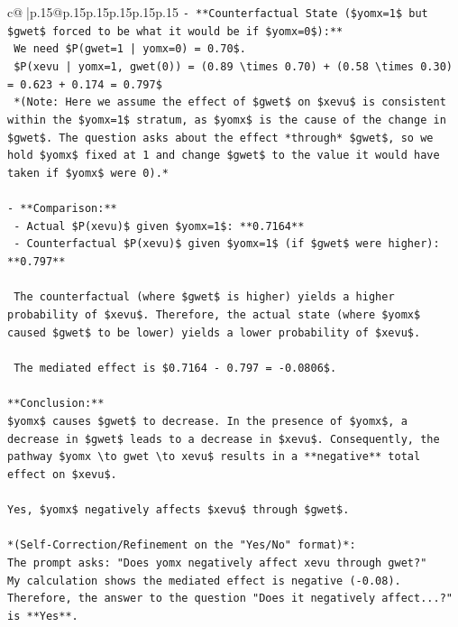 \documentclass{article}
\begin{document}
{\begin{supertabular}{c@{$\;$}|p{.15\linewidth}@{}p{.15\linewidth}p{.15\linewidth}p{.15\linewidth}p{.15\linewidth}p{.15\linewidth}}
{{{\texttt{{-} **Counterfactual State (\$yomx=1\$ but \$gwet\$ forced to be what it would be if \$yomx=0\$):**} \\
\texttt{  We need \$P(gwet=1 | yomx=0) = 0.70\$.} \\
\texttt{  \$P(xevu | yomx=1, gwet(0)) = (0.89 \textbackslash{}times 0.70) + (0.58 \textbackslash{}times 0.30) = 0.623 + 0.174 = 0.797\$} \\
\texttt{  *(Note: Here we assume the effect of \$gwet\$ on \$xevu\$ is consistent within the \$yomx=1\$ stratum, as \$yomx\$ is the cause of the change in \$gwet\$. The question asks about the effect *through* \$gwet\$, so we hold \$yomx\$ fixed at 1 and change \$gwet\$ to the value it would have taken if \$yomx\$ were 0).*} \\
\\ 
\texttt{{-} **Comparison:**} \\
\texttt{  {-} Actual \$P(xevu)\$ given \$yomx=1\$: **0.7164**} \\
\texttt{  {-} Counterfactual \$P(xevu)\$ given \$yomx=1\$ (if \$gwet\$ were higher): **0.797**} \\
\\ 
\texttt{  The counterfactual (where \$gwet\$ is higher) yields a higher probability of \$xevu\$. Therefore, the actual state (where \$yomx\$ caused \$gwet\$ to be lower) yields a lower probability of \$xevu\$.} \\
\\ 
\texttt{  The mediated effect is \$0.7164 {-} 0.797 = {-}0.0806\$.} \\
\\ 
\texttt{**Conclusion:**} \\
\texttt{\$yomx\$ causes \$gwet\$ to decrease. In the presence of \$yomx\$, a decrease in \$gwet\$ leads to a decrease in \$xevu\$. Consequently, the pathway \$yomx \textbackslash{}to gwet \textbackslash{}to xevu\$ results in a **negative** total effect on \$xevu\$.} \\
\\ 
\texttt{Yes, \$yomx\$ negatively affects \$xevu\$ through \$gwet\$.} \\
\\ 
\texttt{*(Self{-}Correction/Refinement on the "Yes/No" format)*:} \\
\texttt{The prompt asks: "Does yomx negatively affect xevu through gwet?"} \\
\texttt{My calculation shows the mediated effect is negative ({-}0.08).} \\
\texttt{Therefore, the answer to the question "Does it negatively affect...?" is **Yes**.} \\
}}}
\end{supertabular}}
\end{document}
